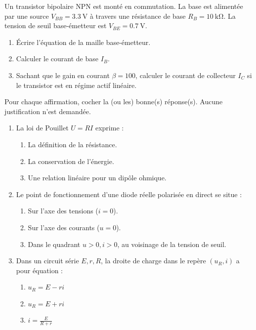 \documentclass[11pt]{article}
\begin{document}
\begin{exercice}
Un transistor bipolaire NPN est monté en commutation. La base est alimentée par une source $V_{BB} = \SI{3,3}{\volt}$ à travers une résistance de base $R_B = \SI{10}{\kilo\ohm}$. La tension de seuil base-émetteur est $V_{BE} = \SI{0,7}{\volt}$.
\begin{enumerate}
    \item Écrire l'équation de la maille base-émetteur.
    \item Calculer le courant de base $I_B$.
    \item Sachant que le gain en courant $\beta = 100$, calculer le courant de collecteur $I_C$ si le transistor est en régime actif linéaire.
\end{enumerate}
\end{exercice}

\begin{exercice}
Pour chaque affirmation, cocher la (ou les) bonne(s) réponse(s). Aucune justification n'est demandée.
\begin{enumerate}
    \item La loi de Pouillet $U = R I$ exprime :
    \begin{enumerate}
        \item La définition de la résistance.
        \item La conservation de l'énergie.
        \item Une relation linéaire pour un dipôle ohmique.
    \end{enumerate}
    \item Le point de fonctionnement d'une diode réelle polarisée en direct se situe :
    \begin{enumerate}
        \item Sur l'axe des tensions ($i=0$).
        \item Sur l'axe des courants ($u=0$).
        \item Dans le quadrant $u>0, i>0$, au voisinage de la tension de seuil.
    \end{enumerate}
    \item Dans un circuit série $E, r, R$, la droite de charge dans le repère $(u_R, i)$ a pour équation :
    \begin{enumerate}
        \item $u_R = E - r i$
        \item $u_R = E + r i$
        \item $i = \frac{E}{R+r}$
    \end{enumerate}
\end{enumerate}
\end{exercice}
\end{document}
